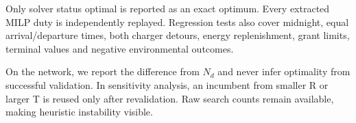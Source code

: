 Only solver status optimal is reported as an exact optimum. Every extracted MILP duty is independently replayed. Regression tests also cover midnight, equal arrival/departure times, both charger detours, energy replenishment, grant limits, terminal values and negative environmental outcomes.


On the network, we report the difference from $N_d$ and never infer optimality from successful validation. In sensitivity analysis, an incumbent from smaller R or larger T is reused only after revalidation. Raw search counts remain available, making heuristic instability visible.

